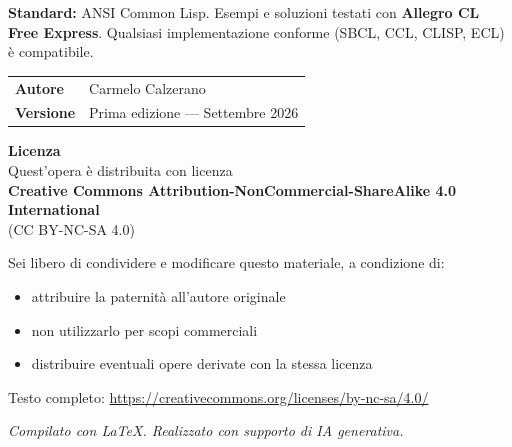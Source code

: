 \documentclass[a4paper,11pt,oneside]{book}
\begin{document}
\vspace{1.2em}

\begin{tcolorbox}[
  enhanced,
  colback=black!3,
  colframe=black!30,
  boxrule=0.5pt,
  arc=3pt,
  left=10pt, right=10pt, top=8pt, bottom=8pt
]
\small
\textbf{Standard:} ANSI Common Lisp.
Esempi e soluzioni testati con \textbf{Allegro CL Free Express}.
Qualsiasi implementazione conforme (SBCL, CCL, CLISP, ECL) è compatibile.
\end{tcolorbox}

\vspace{2em}

\noindent
\begin{tabular}{@{}ll@{}}
\textbf{Autore} & Carmelo Calzerano\\[4pt]
\textbf{Versione} & Prima edizione — Settembre 2026\\
\end{tabular}

\vspace{2em}

\begin{tcolorbox}[
  enhanced,
  colback=white,
  colframe=black!40,
  boxrule=0.5pt,
  arc=3pt,
  left=10pt, right=10pt, top=8pt, bottom=8pt
]
\small
\textbf{Licenza}\\[4pt]
Quest'opera è distribuita con licenza\\
\textbf{Creative Commons Attribution-NonCommercial-ShareAlike 4.0 International}\\
(CC BY-NC-SA 4.0)

\medskip
Sei libero di condividere e modificare questo materiale, a condizione di:
\begin{itemize}[leftmargin=1.5em, itemsep=2pt, topsep=2pt]
  \item attribuire la paternità all'autore originale
  \item non utilizzarlo per scopi commerciali
  \item distribuire eventuali opere derivate con la stessa licenza
\end{itemize}

\smallskip
\noindent Testo completo: \url{https://creativecommons.org/licenses/by-nc-sa/4.0/}
\end{tcolorbox}

\vspace{1em}
\noindent\small\textit{Compilato con \LaTeX.
Realizzato con supporto di IA generativa.}

\clearpage
\end{document}
